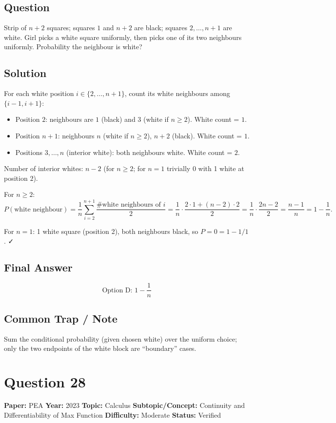 \documentclass[11pt]{article}
\begin{document}
\subsection*{Question}
Strip of $n+2$ squares; squares $1$ and $n+2$ are black; squares $2,\dots,n+1$ are white. Girl picks a white square uniformly, then picks one of its two neighbours uniformly. Probability the neighbour is white?

\subsection*{Solution}
For each white position $i\in\{2,\dots,n+1\}$, count its white neighbours among $\{i-1,i+1\}$:
\begin{itemize}[leftmargin=*,nosep]
\item Position $2$: neighbours are $1$ (black) and $3$ (white if $n\ge 2$). White count = $1$.
\item Position $n+1$: neighbours $n$ (white if $n\ge 2$), $n+2$ (black). White count = $1$.
\item Positions $3,\dots,n$ (interior white): both neighbours white. White count = $2$.
\end{itemize}
Number of interior whites: $n-2$ (for $n\ge 2$; for $n=1$ trivially $0$ with 1 white at position $2$).

For $n\ge 2$:
\[
P(\text{white neighbour})=\frac{1}{n}\sum_{i=2}^{n+1}\frac{\#\text{white neighbours of }i}{2}=\frac{1}{n}\cdot\frac{2\cdot 1+(n-2)\cdot 2}{2}=\frac{1}{n}\cdot\frac{2n-2}{2}=\frac{n-1}{n}=1-\frac{1}{n}.
\]

For $n=1$: 1 white square (position 2), both neighbours black, so $P=0=1-1/1$. ✓

\subsection*{Final Answer}
\[
\boxed{\text{Option D: } 1-\dfrac{1}{n}}
\]

\subsection*{Common Trap / Note}
Sum the conditional probability (given chosen white) over the uniform choice; only the two endpoints of the white block are ``boundary'' cases.

\medskip

\section*{Question 28}
\textbf{Paper:} PEA \quad \textbf{Year:} 2023 \quad \textbf{Topic:} Calculus \quad \textbf{Subtopic/Concept:} Continuity and Differentiability of Max Function \quad \textbf{Difficulty:} Moderate \quad \textbf{Status:} Verified
\end{document}
